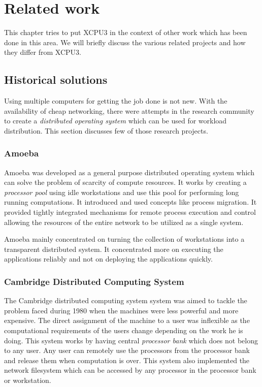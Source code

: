 \chapter{Related work}
\label{chap:related}

\ifpdf
    \graphicspath{{Chapter5/Chapter5Figs/PDF/}{Chapter5/Chapter5Figs/PNG/}
		{Chapter5/Chapter5Figs/}}
\else
    \graphicspath{{Chapter5/Chapter5Figs/EPS/}{Chapter5/Chapter5Figs/}}
\fi

This chapter tries to put XCPU3 in the context of other work which 
has been done in this area.  We will briefly discuss the various related
projects and how they differ from XCPU3.

\section{Historical solutions}
Using multiple computers for getting the job done is not new.  With the
availability of cheap networking, there were attempts in the research community
to create a \textit{distributed operating system} which can be used for workload
distribution. This section discusses few of those research projects.

\subsection{Amoeba}
Amoeba \cite{amoeba} was developed as a general purpose distributed operating
system which can solve the problem of scarcity of compute resources.  It works
by creating a \textit{processor pool} using idle workstations and use this pool
for performing long running computations.  It introduced and used concepts like
process migration. It provided tightly integrated mechanisms for remote
process execution and control allowing the resources of the entire network to be
utilized as a single system.

Amoeba mainly concentrated on turning the collection of workstations into a
transparent distributed system.  It concentrated more on executing the
applications reliably and not on deploying the applications quickly. 

\subsection{Cambridge Distributed Computing System}
The Cambridge distributed computing system\cite{Needham82} system was aimed to 
tackle the problem faced during 1980 when the machines were less powerful and
more expensive.  The direct assignment of the machine to a user was inflexible
as the computational requirements of the users change depending on the work he
is doing.  This system works by having central \textit{processor bank} which
does not belong to any user.  Any user can remotely use the processors from the
processor bank and release them when computation is over.  This system also
implemented the network filesystem which can be accessed by any processor in the
processor bank or workstation.

